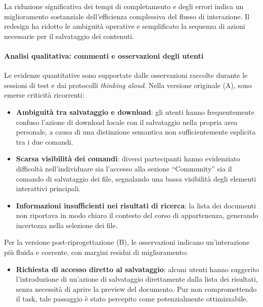 La riduzione significativa dei tempi di completamento e degli errori indica un miglioramento sostanziale dell’efficienza complessiva del flusso di interazione. Il redesign ha ridotto le ambiguità operative e semplificato la sequenza di azioni necessarie per il salvataggio dei contenuti.

\paragraph{Analisi qualitativa: commenti e osservazioni degli utenti}

Le evidenze quantitative sono supportate dalle osservazioni raccolte durante le sessioni di test e dai protocolli \textit{thinking aloud}. Nella versione originale (A), sono emerse criticità ricorrenti:

\begin{itemize}
	\item \textbf{Ambiguità tra salvataggio e download}: gli utenti hanno frequentemente confuso l’azione di download locale con il salvataggio nella propria area personale, a causa di una distinzione semantica non sufficientemente esplicita tra i due comandi.

	\item \textbf{Scarsa visibilità dei comandi}: diversi partecipanti hanno evidenziato difficoltà nell’individuare sia l’accesso alla sezione ``Community'' sia il comando di salvataggio dei file, segnalando una bassa visibilità degli elementi interattivi principali.

	\item \textbf{Informazioni insufficienti nei risultati di ricerca}: la lista dei documenti non riportava in modo chiaro il contesto del corso di appartenenza, generando incertezza nella selezione dei file.
\end{itemize}

Per la versione post-riprogettazione (B), le osservazioni indicano un’interazione più fluida e coerente, con margini residui di miglioramento:

\begin{itemize}
	\item \textbf{Richiesta di accesso diretto al salvataggio}: alcuni utenti hanno suggerito l’introduzione di un’azione di salvataggio direttamente dalla lista dei risultati, senza necessità di aprire la preview del documento. Pur non compromettendo il task, tale passaggio è stato percepito come potenzialmente ottimizzabile.
\end{itemize}

